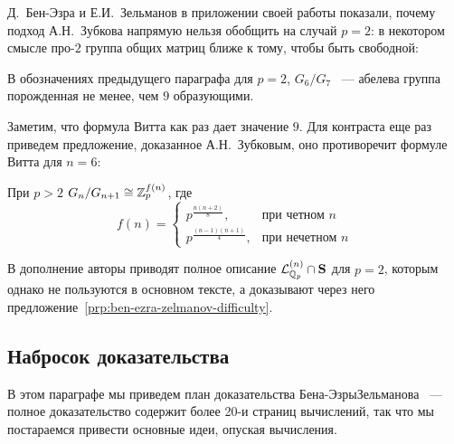 Д.\ Бен-Эзра и Е.И.\ Зельманов в приложении своей работы показали, почему подход А.Н.\ Зубкова напрямую нельзя обобщить на случай $p=2$: в некотором смысле про-$2$ группа общих матриц ближе к тому, чтобы быть свободной:
\begin{proposition}
    \label{prp:ben-ezra-zelmanov-difficulty}
    В обозначениях предыдущего параграфа для $p=2$, $G_6 / G_7$ ~--- абелева группа порожденная не менее, чем $9$ образующими.
\end{proposition}
Заметим, что формула Витта как раз дает значение $9$.
Для контраста еще раз приведем предложение, доказанное А.Н.\ Зубковым, оно противоречит формуле Витта для $n=6$:
\begin{proposition}
    При $p>2$ $G_n / G_{n+1} \cong \mathbb{Z}_p^{f(n)}$, где\\
    \[
        f(n) =
        \begin{cases}
            p^{\frac{n(n+2)}{8}}, & \text{при четном $n$} \\
            p^{\frac{(n-1)(n+1)}{4}}, & \text{при нечетном $n$}
        \end{cases}
    \]
\end{proposition}

В дополнение авторы приводят полное описание $\mathcal{L}^{(n)}_{\mathbb{Q}_p} \cap \mathbf{S}$ для $p=2$, которым однако не пользуются в основном тексте, а доказывают через него предложение~\ref{prp:ben-ezra-zelmanov-difficulty}.

\subsection{Набросок доказательства}\label{subsec:ben-ezra-zelmanov-non-injective}
В этом параграфе мы приведем план доказательства Бена-Эзры\textemdash Зельманова ~--- полное доказательство содержит более 20-и страниц вычислений, так что мы постараемся привести основные идеи, опуская вычисления.

